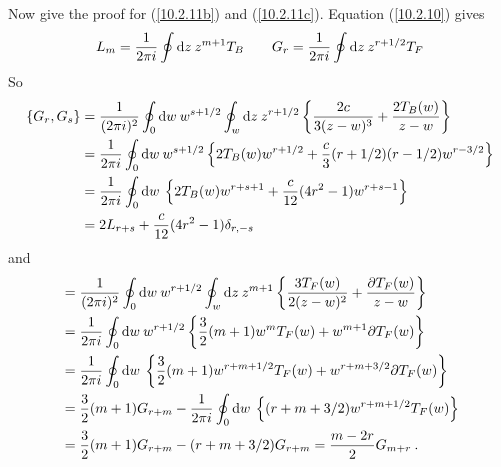 	\begin{tcolorbox}[breakable]
		Now give the proof for (\ref{10.2.11b}) and (\ref{10.2.11c}). Equation (\ref{10.2.10}) gives
		\begin{equation*}
			L_{m}= \frac{1}{2\pi i}  \oint\mathrm{d} z\: z^{m+1}T_{B} \qquad
			G_{r}=\frac{1}{2\pi i}  \oint\mathrm{d} z\: z^{r+1/2}T_{F}
		\end{equation*}
		So
		\begin{align*}
			\{G_{r},G_{s}\} &= \frac{1}{(2\pi i)^{2}} \oint_{0}\mathrm{d} w\: w^{s+1/2} \oint_{w} \mathrm{d} z\:z^{r+1/2}
			\left\{\frac{2c}{3(z-w)^{3}}+\frac{2 T_{B}(w)}{z-w}\right\} \\
			&= \frac{1}{2\pi i} \oint_{0}\mathrm{d} w\: w^{s+1/2} 
			\left\{2T_{B}(w)w^{r+1/2}+ \frac{c}{3}(r+1/2)(r-1/2)w^{r-3/2}\right\} \\
			&= \frac{1}{2\pi i} \oint_{0}\mathrm{d} w\: 
			\left\{2T_{B}(w)w^{r+s+1}+ \frac{c}{12}(4r^{2}-1)w^{r+s-1}\right\} \\
			&= 2L_{r+s}+\frac{c}{12}(4r^{2}-1)\delta_{r,-s}
		\end{align*}
		and
		\begin{align*}
			[L_{m},G_{r}]&= \frac{1}{(2\pi\mi)^{2}} \oint_{0}\dif w\: w^{r+1/2} \oint_{w} \dif z\:z^{m+1}
			\left\{\frac{3T_{F}(w)}{2(z-w)^{2}}+\frac{\partial T_{F}(w)}{z-w}\right\} \\
			&=  \frac{1}{2\pi\mi} \oint_{0}\dif w\: w^{r+1/2}
			\left\{\frac{3}{2}(m+1)w^{m}T_{F}(w)+ w^{m+1}\partial T_{F}(w)\right\} \\
			&=  \frac{1}{2\pi\mi} \oint_{0}\dif w\: 
			\left\{\frac{3}{2}(m+1)w^{r+m+1/2}T_{F}(w)+ w^{r+m+3/2}\partial T_{F}(w)\right\} \\
			&= \frac{3}{2}(m+1) G_{r+m} - \frac{1}{2\pi\mi} \oint_{0}\dif w\:
			\left\{(r+m+3/2)w^{r+m+1/2}T_{F}(w)\right\} \\
			&=\frac{3}{2}(m+1) G_{r+m} - (r+m+3/2)G_{r+m} =\frac{m-2r}{2}G_{m+r} \:.
		\end{align*}
	\end{tcolorbox}
	
